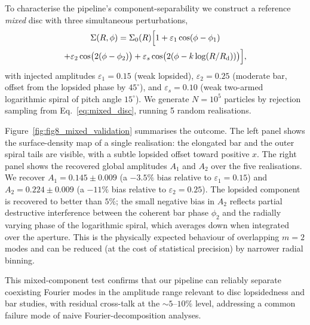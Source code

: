 \documentclass[fleqn,usenatbib]{mnras}
\newcommand{\Am}[1]{A_{#1}}
\newcommand{\Rd}{R_{\rm d}}
\newcommand{\Amone}{\ensuremath{\Am{1}}}
\newcommand{\Amtwo}{\ensuremath{\Am{2}}}
\begin{document}
To characterise the pipeline's component-separability we construct a
reference \emph{mixed} disc with three simultaneous perturbations,
\begin{multline}
  \Sigma(R, \phi) = \Sigma_0(R) \Bigl[
      1 + \varepsilon_1 \cos(\phi - \phi_1) \\
      + \varepsilon_2 \cos\bigl(2(\phi - \phi_2)\bigr)
      + \varepsilon_s \cos\bigl(2(\phi - k\log(R/\Rd))\bigr)
  \Bigr],
  \label{eq:mixed_disc}
\end{multline}
with injected amplitudes $\varepsilon_1 = 0.15$ (weak lopsided),
$\varepsilon_2 = 0.25$ (moderate bar, offset from the lopsided phase
by $45^{\circ}$), and $\varepsilon_s = 0.10$ (weak two-armed
logarithmic spiral of pitch angle $15^{\circ}$).  We generate
$N = 10^5$ particles by rejection sampling from
Eq.~\ref{eq:mixed_disc}, running 5 random realisations.

Figure~\ref{fig:fig8_mixed_validation} summarises the outcome.  The
left panel shows the surface-density map of a single realisation:
the elongated bar and the outer spiral tails are visible, with a
subtle lopsided offset toward positive $x$.  The right panel shows
the recovered global amplitudes $\Amone$ and $\Amtwo$ over the five
realisations.  We recover $\Amone = 0.145 \pm 0.009$ (a $-3.5\%$
bias relative to $\varepsilon_1 = 0.15$) and
$\Amtwo = 0.224 \pm 0.009$ (a $-11\%$ bias relative to
$\varepsilon_2 = 0.25$).  The lopsided component is recovered to
better than $5\%$; the small negative bias in $\Amtwo$ reflects
partial destructive interference between the coherent bar phase
$\phi_2$ and the radially varying phase of the logarithmic
spiral, which averages down when integrated over the aperture.
This is the physically expected behaviour of overlapping $m=2$
modes and can be reduced (at the cost of statistical precision)
by narrower radial binning.

This mixed-component test confirms that our pipeline can reliably
separate coexisting Fourier modes in the amplitude range relevant
to disc lopsidedness and bar studies, with residual cross-talk at
the $\sim 5$--$10\%$ level, addressing a common failure mode of
naive Fourier-decomposition analyses.
\end{document}
